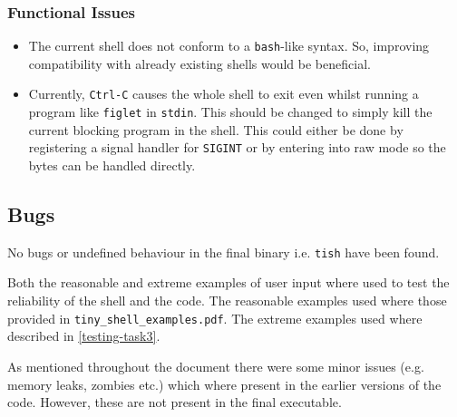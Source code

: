 \documentclass[12pt]{article}
\begin{document}
\subsubsection{Functional Issues}

\begin{itemize}
\item
  The current shell does not conform to a \texttt{bash}-like
  syntax. So, improving compatibility with already existing
  shells would be beneficial.
\item
  Currently, \texttt{Ctrl-C} causes the whole shell to exit even
  whilst running a program like \texttt{figlet} in
  \texttt{stdin}. This should be changed to simply kill the
  current blocking program in the shell. This could either be
  done by registering a signal handler for \texttt{SIGINT} or by
  entering into raw mode so the bytes can be handled directly.
\end{itemize}

\subsection{Bugs}

No bugs or undefined behaviour in the final binary i.e.
\texttt{tish} have been found.

Both the reasonable and extreme examples of user input where
used to test the reliability of the shell and the code. The
reasonable examples used where those provided in
\texttt{tiny\_shell\_examples.pdf}. The extreme examples used
where described in \ref{testing-task3}.

As mentioned throughout the document there were some minor
issues (e.g. memory leaks, zombies etc.) which where present in
the earlier versions of the code. However, these are not present
in the final executable.
\end{document}
